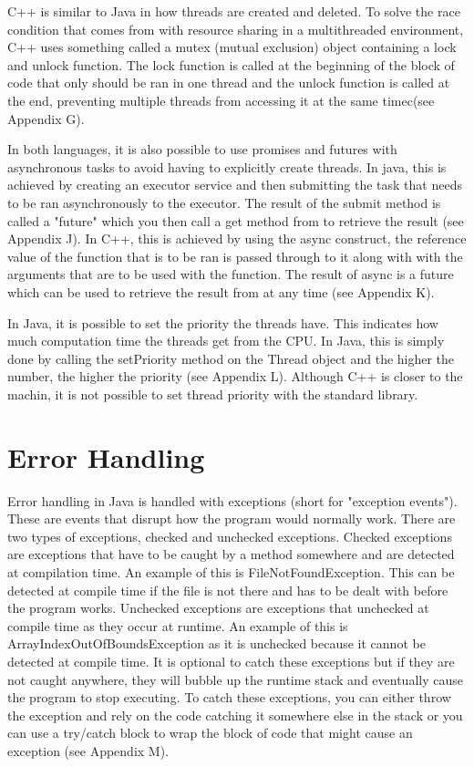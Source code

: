 \documentclass[]{report}
\begin{document}
C++ is similar to Java in how threads are created and deleted. To solve the race condition that comes from with resource sharing in a multithreaded environment, C++ uses something called a mutex (mutual exclusion) object containing a lock and unlock function. The lock function is called at the beginning of the block of code that only should be ran in one thread and the unlock function is called at the end, preventing multiple threads from accessing it at the same timec(see Appendix G).

In both languages, it is also possible to use promises and futures with asynchronous tasks to avoid having to explicitly create threads. In java, this is achieved by creating an executor service and then submitting the task that needs to be ran asynchronously to the executor. The result of the submit method is called a "future" which you then call a get method from to retrieve the result (see Appendix J). In C++, this is achieved by using the async construct, the reference value of the function that is to be ran is passed through to it along with with the arguments that are to be used with the function. The result of async is a future which can be used to retrieve the result from at any time (see Appendix K).

In Java, it is possible to set the priority the threads have. This indicates how much computation time the threads get from the CPU. In Java, this is simply done by calling the setPriority method on the Thread object and the higher the number, the higher the priority (see Appendix L). Although C++ is closer to the machin, it is not possible to set thread priority with the standard library.

\section{Error Handling}
Error handling in Java is handled with exceptions (short for "exception events"). These are events that disrupt how the program would normally work. There are two types of exceptions, checked and unchecked exceptions. Checked exceptions are exceptions that have to be caught by a method somewhere and are detected at compilation time. An example of this is FileNotFoundException. This can be detected at compile time if the file is not there and has to be dealt with before the program works. Unchecked exceptions are exceptions that unchecked at compile time as they occur at runtime. An example of this is ArrayIndexOutOfBoundsException as it is unchecked because it cannot be detected at compile time. It is optional to catch these exceptions but if they are not caught anywhere, they will bubble up the runtime stack and eventually cause the program to stop executing. To catch these exceptions, you can either throw the exception and rely on the code catching it somewhere else in the stack or you can use a try/catch block to wrap the block of code that might cause an exception (see Appendix M).
\end{document}
